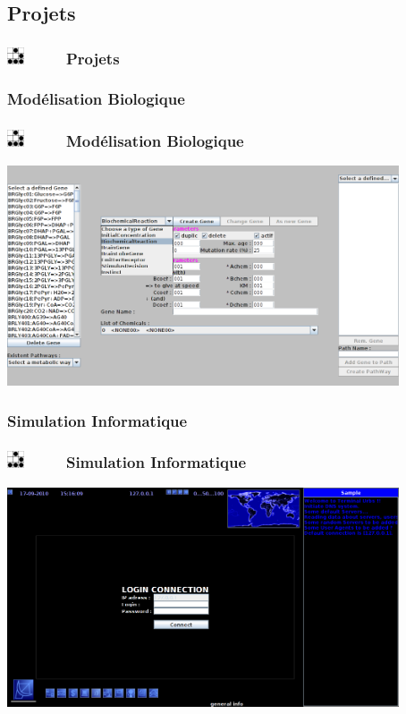 \documentclass[slidetop,11pt]{beamer}
\def\sectionPartIIc{Projets}
\def\sectionPartIIcUN{Mod{\'e}lisation Biologique}
\def\sectionPartIIcDE{Simulation Informatique}
\def\moreInFrameTitle{\includegraphics[height=0.5cm]{img/logo_glider.png}~~~~~}
\begin{document}
\subsection{\sectionPartIIc}
\begin{frame}
	\frametitle{\moreInFrameTitle \sectionPartIIc}
	\tableofcontents[sections=1,subsectionstyle=show/shaded/hide,subsubsectionstyle=show/show/hide]
\end{frame}

\subsubsection{\sectionPartIIcUN}
\begin{frame}
	\frametitle{\moreInFrameTitle \sectionPartIIcUN}
	\begin{center}
	\includegraphics[height=6.5cm,width=11.6cm]{img/persoGeneCreatorGUI.png} 
	\end{center}
\end{frame}

\subsubsection{\sectionPartIIcDE}
\begin{frame}
	\frametitle{\moreInFrameTitle \sectionPartIIcDE}
	\begin{center}
	\includegraphics[height=6.5cm,width=11.6cm]{img/persoUplinkTerminalUrbs.png} 
	\end{center}
\end{frame}
\end{document}

